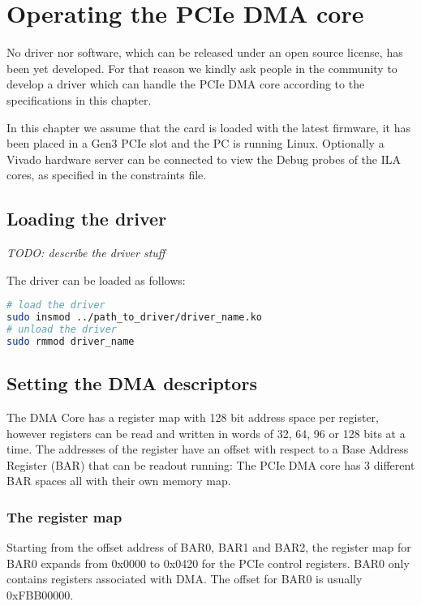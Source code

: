 \section{Operating the PCIe DMA core}
No driver nor software, which can be released under an open source license, has been yet developed. For that reason we kindly ask people in the community to develop a driver which can handle the PCIe DMA core according to the specifications in this chapter.

In this chapter we assume that the card is loaded with the latest firmware, it has been placed in a Gen3 PCIe slot and the PC is running Linux. Optionally a Vivado hardware server can be connected to view the Debug probes of the ILA cores, as specified in the constraints file. \cite{programming}\

\subsection{Loading the driver}

\emph{TODO: describe the driver stuff}

The driver can be loaded as follows:
\begin{lstlisting}[language=BASH, frame=single, caption=Loading the driver]
# load the driver
sudo insmod ../path_to_driver/driver_name.ko
# unload the driver
sudo rmmod driver_name
\end{lstlisting}


\subsection{Setting the DMA descriptors}

The DMA Core has a register map with 128 bit address space per register, however registers can be read and written in words of 32, 64, 96 or 128 bits at a time. The addresses of the register have an offset with respect to a Base Address Register (BAR) that can be readout running: The PCIe DMA core has 3 different BAR spaces all with their own memory map. 
\newpage

\subsubsection{The register map}

Starting from the offset address of BAR0, BAR1 and BAR2, the register map for BAR0 expands from 0x0000 to 0x0420 for the PCIe control registers. BAR0 only contains registers associated with DMA. The offset for BAR0 is usually 0xFBB00000.


